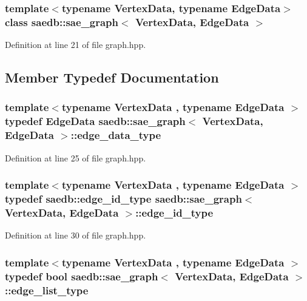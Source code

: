 \subsubsection*{template$<$typename Vertex\-Data, typename Edge\-Data$>$class saedb\-::sae\-\_\-graph$<$ Vertex\-Data, Edge\-Data $>$}



Definition at line 21 of file graph.\-hpp.



\subsection{Member Typedef Documentation}
\hypertarget{classsaedb_1_1sae__graph_a3f786e0be3d855a988333235a6b50d02}{
\subsubsection[{edge\-\_\-data\-\_\-type}]{\setlength{\rightskip}{0pt plus 5cm}template$<$typename Vertex\-Data , typename Edge\-Data $>$ typedef Edge\-Data {\bf saedb\-::sae\-\_\-graph}$<$ Vertex\-Data, Edge\-Data $>$\-::{\bf edge\-\_\-data\-\_\-type}}}\label{d6/d2b/classsaedb_1_1sae__graph_a3f786e0be3d855a988333235a6b50d02}


Definition at line 25 of file graph.\-hpp.

\hypertarget{classsaedb_1_1sae__graph_a5f39a5f8d12ae17fd09fad90004229d7}{
\subsubsection[{edge\-\_\-id\-\_\-type}]{\setlength{\rightskip}{0pt plus 5cm}template$<$typename Vertex\-Data , typename Edge\-Data $>$ typedef {\bf saedb\-::edge\-\_\-id\-\_\-type} {\bf saedb\-::sae\-\_\-graph}$<$ Vertex\-Data, Edge\-Data $>$\-::{\bf edge\-\_\-id\-\_\-type}}}\label{d6/d2b/classsaedb_1_1sae__graph_a5f39a5f8d12ae17fd09fad90004229d7}


Definition at line 30 of file graph.\-hpp.

\hypertarget{classsaedb_1_1sae__graph_a5801338c962bef55a7bd3a18ebff8e9c}{
\subsubsection[{edge\-\_\-list\-\_\-type}]{\setlength{\rightskip}{0pt plus 5cm}template$<$typename Vertex\-Data , typename Edge\-Data $>$ typedef bool {\bf saedb\-::sae\-\_\-graph}$<$ Vertex\-Data, Edge\-Data $>$\-::{\bf edge\-\_\-list\-\_\-type}}}\label{d6/d2b/classsaedb_1_1sae__graph_a5801338c962bef55a7bd3a18ebff8e9c}


